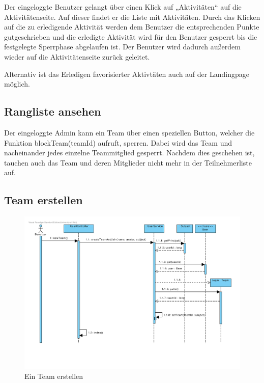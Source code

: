 Der eingeloggte Benutzer gelangt über einen Klick auf „Aktivitäten“
auf die Aktivitätenseite. Auf dieser findet er die Liste mit
Aktivitäten. Durch das Klicken auf die zu erledigende Aktivität werden
dem Benutzer die entsprechenden Punkte gutgeschrieben und die
erledigte Aktivität wird für den Benutzer gesperrt bis die festgelegte
Sperrphase abgelaufen ist. Der Benutzer wird dadurch außerdem wieder auf die
Aktivitätenseite zurück geleitet.

Alternativ ist das Erledigen favorisierter Aktivtäten auch auf der
Landingpage möglich.

\subsection{Rangliste ansehen}


Der eingeloggte Admin kann ein Team über einen speziellen Button, welcher die Funktion blockTeam(teamId) aufruft, sperren. Dabei wird das Team und nacheinander jedes einzelne Teammitglied gesperrt. Nachdem dies geschehen ist, tauchen auch das Team und deren Mitglieder nicht mehr in der Teilnehmerliste auf.\\

\subsection{Team erstellen}
\begin{figure}[H]
  \centering
  \includegraphics[width=\textwidth, clip]{gfx/team_erstellen}
  \caption{Ein Team erstellen}
\end{figure}

